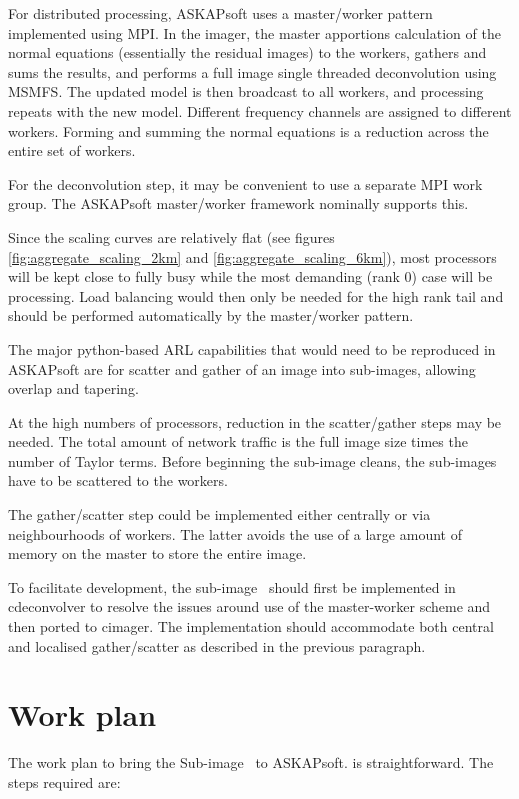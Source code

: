 \documentclass[11pt,a4paper,variablewidth]{article}
\begin{document}
For distributed processing, ASKAPsoft uses a master/worker pattern implemented using MPI. In the imager, the master apportions calculation of the normal equations (essentially the residual images) to the workers, gathers and sums the results, and performs a full image single threaded deconvolution using MSMFS. The updated model is then broadcast to all workers, and processing repeats with the new model. Different frequency channels are assigned to different workers. Forming and summing the normal equations is a reduction across the entire set of workers.

For the deconvolution step, it may be convenient to use a separate MPI work group. The ASKAPsoft master/worker framework nominally supports this.

Since the scaling curves are relatively flat (see figures \ref{fig:aggregate_scaling_2km} and \ref{fig:aggregate_scaling_6km}), most processors will be kept close to fully busy while the most demanding (rank 0) case will be processing. Load balancing would then only be needed for the high rank tail and should be performed automatically by the master/worker pattern.

The major python-based ARL capabilities that would need to be reproduced in ASKAPsoft are for scatter and gather of an image into sub-images, allowing overlap and tapering. 

At the high numbers of processors, reduction in the scatter/gather steps may be needed. The total amount of network traffic is the full image size times the number of Taylor terms. Before beginning the sub-image cleans, the sub-images have to be scattered to the workers. 

The gather/scatter step could be implemented either centrally or via neighbourhoods of workers. The latter avoids the use of a large amount of memory on the master to store the entire image.

To facilitate development, the sub-image \MAM\ should first be implemented in cdeconvolver to resolve the issues around use of the master-worker scheme and then ported to cimager. The implementation should accommodate both central and localised gather/scatter as described in the previous paragraph.
	
\pagebreak
\section{Work plan}

The work plan to bring the Sub-image \MAM\ to ASKAPsoft. is straightforward. The steps required are:
\end{document}
